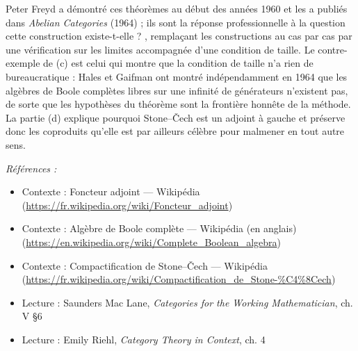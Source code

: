 \documentclass[11pt]{article}
\newenvironment{refs}{\par\small\noindent\emph{Références :}\begin{itemize}\setlength\itemsep{0pt}}{\end{itemize}\normalsize}
\begin{document}
\noindent Peter Freyd a démontré ces théorèmes au début des années 1960 et les a publiés
dans \textit{Abelian Categories} (1964) ; ils sont la réponse professionnelle à la question \og{} cette
construction existe-t-elle ? \fg{}, remplaçant les constructions au cas par cas par une vérification
sur les limites accompagnée d'une condition de taille. Le contre-exemple de (c) est celui qui
montre que la condition de taille n'a rien de bureaucratique : Hales et Gaifman ont montré
indépendamment en 1964 que les algèbres de Boole complètes libres sur une infinité de générateurs
n'existent pas, de sorte que les hypothèses du théorème sont la frontière honnête de la méthode.
La partie (d) explique pourquoi Stone--\v{C}ech est un adjoint à gauche et préserve donc les coproduits
qu'elle est par ailleurs célèbre pour malmener en tout autre sens.

\begin{refs}
\item Contexte : Foncteur adjoint --- Wikipédia (\url{https://fr.wikipedia.org/wiki/Foncteur_adjoint})
\item Contexte : Algèbre de Boole complète --- Wikipédia (en anglais) (\url{https://en.wikipedia.org/wiki/Complete_Boolean_algebra})
\item Contexte : Compactification de Stone--\v{C}ech --- Wikipédia (\url{https://fr.wikipedia.org/wiki/Compactification_de_Stone-%C4%8Cech})
\item Lecture : Saunders Mac Lane, \textit{Categories for the Working Mathematician}, ch. V \S{}6
\item Lecture : Emily Riehl, \textit{Category Theory in Context}, ch. 4
\end{refs}

\bigskip
\end{document}
